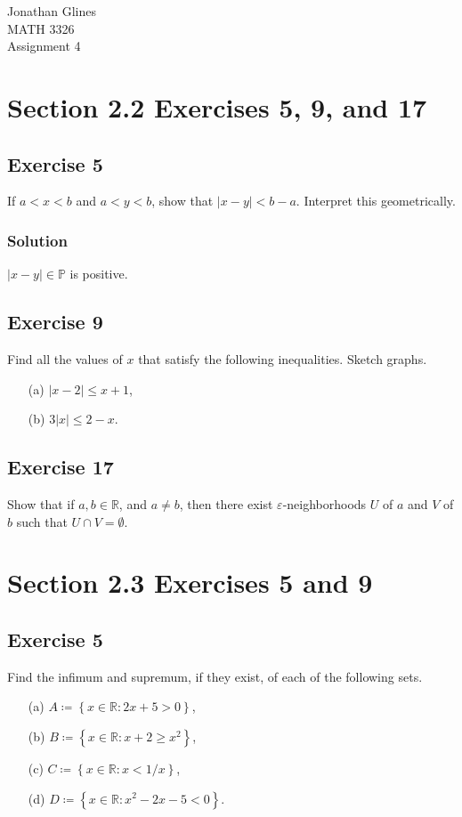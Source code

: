 \documentclass[12pt]{article}
\begin{document}
\begin{flushright}
{\Large
Jonathan Glines \\
MATH 3326 \\
Assignment 4 \\
}
\end{flushright}
\section*{Section 2.2 Exercises 5, 9, and 17}
\subsection*{Exercise 5}
If $a < x < b$ and $a < y < b$, show that $\left|x - y\right| < b - a$. Interpret this geometrically.

\subsubsection*{Solution}
$\left|x - y\right| \in \mathbb{P}$ is positive.

\subsection*{Exercise 9}
Find all the values of $x$ that satisfy the following inequalities. Sketch graphs.
\begin{itemize}
\item[(a)] $\left|x - 2\right| \leq x + 1$,
\item[(b)] $3\left|x\right| \leq 2 - x$.
\end{itemize}

\subsection*{Exercise 17}
Show that if $a, b \in \mathbb{R}$, and $a \neq b$, then there exist $\varepsilon$-neighborhoods $U$ of $a$ and $V$ of $b$ such that $U \cap V = \emptyset$.

\section*{Section 2.3 Exercises 5 and 9}
\subsection*{Exercise 5}
Find the infimum and supremum, if they exist, of each of the following sets.
\begin{itemize}
\item[(a)] $A \coloneqq \left\{x \in \mathbb{R} : 2x + 5 > 0\right\}$,
\item[(b)] $B \coloneqq \left\{x \in \mathbb{R} : x + 2 \geq x^2\right\}$,
\item[(c)] $C \coloneqq \left\{x \in \mathbb{R} : x < 1/x\right\}$,
\item[(d)] $D \coloneqq \left\{x \in \mathbb{R} : x^2 - 2x - 5 < 0\right\}$.
\end{itemize}
\end{document}
